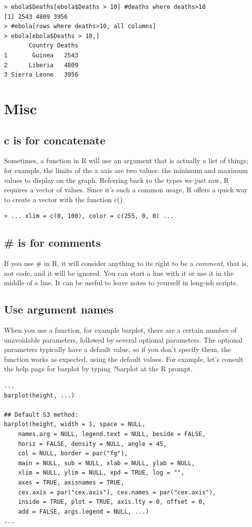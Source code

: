 \documentclass{report}
\newcommand{\code}[1]{\textsf{\ttfamily #1}}
\begin{document}
	\begin{verbatim}
> ebola$Deaths[ebola$Deaths > 10] #deaths where deaths>10
[1] 2543 4809 3956
> #ebola[rows where deaths>10, all columns]
> ebola[ebola$Deaths > 10,] 
       Country Deaths
1       Guinea   2543
2      Liberia   4809
3 Sierra Leone   3956
	\end{verbatim}
	
	\section{Misc}
		\subsection{\code{c} is for concatenate}
		Sometimes, a function in R will use an argument that is actually a list of things; for example, the limits of the x axis are two values: the minimum and maximum values to display on the graph. Referring back to the types we just saw, R requires a \code{vector} of values. Since it's such a common usage, R offers a quick way to create a vector with the function \code{c()}.
		\begin{verbatim}
> ... xlim = c(0, 100), color = c(255, 0, 0) ...
		\end{verbatim}
	
		\subsection{\# is for comments}
		If you use \code{\#} in R, it will consider anything to its right to be a \emph{comment}, that is, not code, and it will be ignored. You can start a line with it or use it in the middle of a line. It can be useful to leave notes to yourself in long-ish scripts.
	
		\subsection{Use argument names}
		When you use a function, for example \code{barplot}, there are a certain number of unavoidable parameters, followed by several optional parameters. The optional parameters typically have a default value, so if you don't specify them, the function works as expected, using the default values. For example, let's consult the help page for \code{barplot} by typing \code{?barplot} at the R prompt.
		\begin{verbatim}
...
barplot(height, ...)

## Default S3 method:
barplot(height, width = 1, space = NULL,
	names.arg = NULL, legend.text = NULL, beside = FALSE,
	horiz = FALSE, density = NULL, angle = 45,
	col = NULL, border = par("fg"),
	main = NULL, sub = NULL, xlab = NULL, ylab = NULL,
	xlim = NULL, ylim = NULL, xpd = TRUE, log = "",
	axes = TRUE, axisnames = TRUE,
	cex.axis = par("cex.axis"), cex.names = par("cex.axis"),
	inside = TRUE, plot = TRUE, axis.lty = 0, offset = 0,
	add = FALSE, args.legend = NULL, ...)
...
		\end{verbatim}
	
\end{document}
